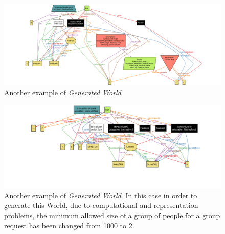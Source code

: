  \begin{figure}[H]
 \begin{center}
   \includegraphics[width=\textwidth]{./img/alloy/alloy5.png}
   \hspace{0.05\linewidth}
   \centering
   \caption{Another example of \textit{Generated World}}
   \label{img:generatedWorld3}
 \end{center}
 \end{figure}

 \begin{figure}[H]
 \begin{center}
   \includegraphics[width=\textwidth]{./img/alloy/alloy6.png}
   \hspace{0.05\linewidth}
   \centering
   \caption{Another example of \textit{Generated World}. In this case in order to generate this World, due to computational and representation problems, the minimum allowed size of a group of people for a group request has been changed from 1000 to 2.}
   \label{img:generatedWorld4}
 \end{center}
 \end{figure}
 \clearpage

